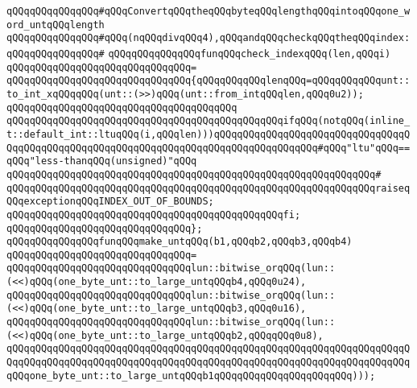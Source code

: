 \newline
\verb|qQQqqQQqqQQqqQQq#qQQqConvertqQQqtheqQQqbyteqQQqlengthqQQqintoqQQqone_word_untqQQqlength|\newline
\verb|qQQqqQQqqQQqqQQq#qQQq(nqQQqdivqQQq4),qQQqandqQQqcheckqQQqtheqQQqindex:|\newline
\verb|qQQqqQQqqQQqqQQq#|\newline
\verb|qQQqqQQqqQQqqQQqfunqQQqcheck_indexqQQq(len,qQQqi)|\newline
\verb|qQQqqQQqqQQqqQQqqQQqqQQqqQQqqQQq=|\newline
\verb|qQQqqQQqqQQqqQQqqQQqqQQqqQQqqQQq{qQQqqQQqqQQqlenqQQq=qQQqqQQqqQQqunt::to_int_xqQQqqQQq(unt::(>>)qQQq(unt::from_intqQQqlen,qQQq0u2));|\newline
\verb|qQQqqQQqqQQqqQQqqQQqqQQqqQQqqQQqqQQqqQQq|\newline
\verb|qQQqqQQqqQQqqQQqqQQqqQQqqQQqqQQqqQQqqQQqqQQqqQQqifqQQq(notqQQq(inline_t::default_int::ltuqQQq(i,qQQqlen)))qQQqqQQqqQQqqQQqqQQqqQQqqQQqqQQqqQQqqQQqqQQqqQQqqQQqqQQqqQQqqQQqqQQqqQQqqQQqqQQqqQQqqQQq#qQQq"ltu"qQQq==qQQq"less-thanqQQq(unsigned)"qQQq|\newline
\verb|qQQqqQQqqQQqqQQqqQQqqQQqqQQqqQQqqQQqqQQqqQQqqQQqqQQqqQQqqQQqqQQq#|\newline
\verb|qQQqqQQqqQQqqQQqqQQqqQQqqQQqqQQqqQQqqQQqqQQqqQQqqQQqqQQqqQQqqQQqraiseqQQqexceptionqQQqINDEX_OUT_OF_BOUNDS;|\newline
\verb|qQQqqQQqqQQqqQQqqQQqqQQqqQQqqQQqqQQqqQQqqQQqqQQqfi;|\newline
\verb|qQQqqQQqqQQqqQQqqQQqqQQqqQQqqQQq};|\newline
\newline
\verb|qQQqqQQqqQQqqQQqfunqQQqmake_untqQQq(b1,qQQqb2,qQQqb3,qQQqb4)|\newline
\verb|qQQqqQQqqQQqqQQqqQQqqQQqqQQqqQQq=|\newline
\verb|qQQqqQQqqQQqqQQqqQQqqQQqqQQqqQQqlun::bitwise_orqQQq(lun::(<<)qQQq(one_byte_unt::to_large_untqQQqb4,qQQq0u24),|\newline
\verb|qQQqqQQqqQQqqQQqqQQqqQQqqQQqqQQqlun::bitwise_orqQQq(lun::(<<)qQQq(one_byte_unt::to_large_untqQQqb3,qQQq0u16),|\newline
\verb|qQQqqQQqqQQqqQQqqQQqqQQqqQQqqQQqlun::bitwise_orqQQq(lun::(<<)qQQq(one_byte_unt::to_large_untqQQqb2,qQQqqQQq0u8),|\newline
\verb|qQQqqQQqqQQqqQQqqQQqqQQqqQQqqQQqqQQqqQQqqQQqqQQqqQQqqQQqqQQqqQQqqQQqqQQqqQQqqQQqqQQqqQQqqQQqqQQqqQQqqQQqqQQqqQQqqQQqqQQqqQQqqQQqqQQqqQQqqQQqqQQqone_byte_unt::to_large_untqQQqb1qQQqqQQqqQQqqQQqqQQqqQQq)));|\newline
